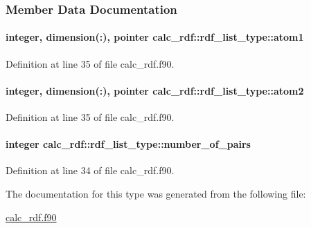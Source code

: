 \subsubsection{Member Data Documentation}
\hypertarget{structcalc__rdf_1_1rdf__list__type_abac5b081ad034e2b0c4a8dcf97970660}{
\paragraph[{atom1}]{\setlength{\rightskip}{0pt plus 5cm}integer, dimension(\-:), pointer calc\-\_\-rdf\-::rdf\-\_\-list\-\_\-type\-::atom1}}\label{structcalc__rdf_1_1rdf__list__type_abac5b081ad034e2b0c4a8dcf97970660}


Definition at line 35 of file calc\-\_\-rdf.\-f90.

\hypertarget{structcalc__rdf_1_1rdf__list__type_ae32f73fe1e1d07410a01158985cfee14}{
\paragraph[{atom2}]{\setlength{\rightskip}{0pt plus 5cm}integer, dimension(\-:), pointer calc\-\_\-rdf\-::rdf\-\_\-list\-\_\-type\-::atom2}}\label{structcalc__rdf_1_1rdf__list__type_ae32f73fe1e1d07410a01158985cfee14}


Definition at line 35 of file calc\-\_\-rdf.\-f90.

\hypertarget{structcalc__rdf_1_1rdf__list__type_a3c971d538222b3d12c9dd44cb533d1d1}{
\paragraph[{number\-\_\-of\-\_\-pairs}]{\setlength{\rightskip}{0pt plus 5cm}integer calc\-\_\-rdf\-::rdf\-\_\-list\-\_\-type\-::number\-\_\-of\-\_\-pairs}}\label{structcalc__rdf_1_1rdf__list__type_a3c971d538222b3d12c9dd44cb533d1d1}


Definition at line 34 of file calc\-\_\-rdf.\-f90.



The documentation for this type was generated from the following file\-:\begin{DoxyCompactItemize}
\item 
\hyperlink{calc__rdf_8f90}{calc\-\_\-rdf.\-f90}\end{DoxyCompactItemize}
